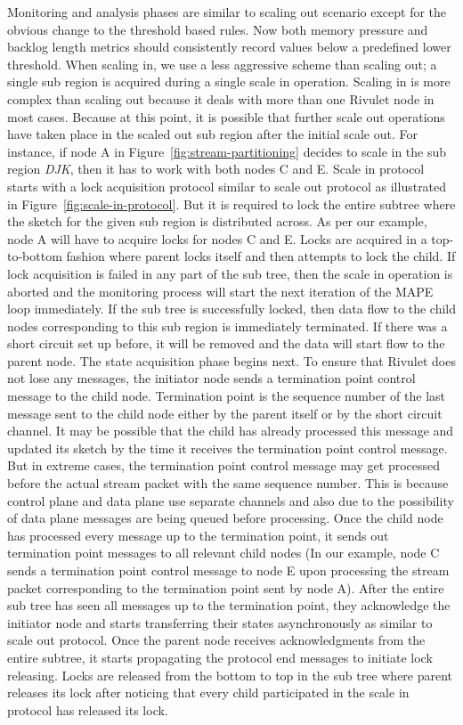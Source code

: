 Monitoring and analysis phases are similar to scaling out scenario except for the obvious change to the threshold based rules.
Now both memory pressure and backlog length metrics should consistently record values below a predefined lower threshold.
When scaling in, we use a less aggressive scheme than scaling out; a single sub region is acquired during a single scale in operation.
Scaling in is more complex than scaling out because it deals with more than one Rivulet node in most cases.
Because at this point, it is possible that further scale out operations have taken place in the scaled out sub region after the initial scale out.
For instance, if node A in Figure~\ref{fig:stream-partitioning} decides to scale in the sub region \emph{DJK}, then it has to work with both nodes C and E.
Scale in protocol starts with a lock acquisition protocol similar to scale out protocol as illustrated in Figure~\ref{fig:scale-in-protocol}.
But it is required to lock the entire subtree where the sketch for the given sub region is distributed across.
As per our example, node A will have to acquire locks for nodes C and E.
Locks are acquired in a top-to-bottom fashion where parent locks itself and then attempts to lock the child.
If lock acquisition is failed in any part of the sub tree, then the scale in operation is aborted and the monitoring process will start the next iteration of the MAPE loop immediately.
If the sub tree is successfully locked, then data flow to the child nodes corresponding to this sub region is immediately terminated.
If there was a short circuit set up before, it will be removed and the data will start flow to the parent node.
The state acquisition phase begins next.
To ensure that Rivulet does not lose any messages, the initiator node sends a termination point control message to the child node.
Termination point is the sequence number of the last message sent to the child node either by the parent itself or by the short circuit channel.
It may be possible that the child has already processed this message and updated its sketch by the time it receives the termination point control message.
But in extreme cases, the termination point control message may get processed before the actual stream packet with the same sequence number.
This is because control plane and data plane use separate channels and also due to the possibility of data plane messages are being queued before processing.
Once the child node has processed every message up to the termination point, it sends out termination point messages to all relevant child nodes (In our example, node C sends a termination point control message to node E upon processing the stream packet corresponding to the termination point sent by node A).
After the entire sub tree has seen all messages up to the termination point, they acknowledge the initiator node and starts transferring their states asynchronously as similar to scale out protocol.
Once the parent node receives acknowledgments from the entire subtree, it starts propagating the protocol end messages to initiate lock releasing.
Locks are released from the bottom to top in the sub tree where parent releases its lock after noticing that every child participated in the scale in protocol has released its lock.

